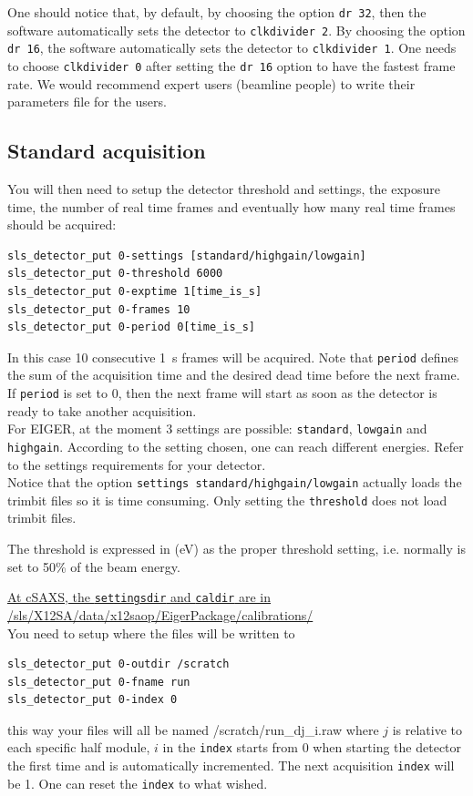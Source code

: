 \documentclass{article}
\newcommand{\E}{EIGER\xspace}
\begin{document}
One should notice that, by default, by choosing the option {\tt{dr 32}}, then the software automatically sets the detector to  {\tt{clkdivider 2}}. By choosing the option {\tt{dr 16}}, the software automatically sets the detector to  {\tt{clkdivider 1}}. One needs to choose {\tt{clkdivider 0}} after setting the {\tt{dr 16}} option to have the fastest frame rate. 
We would recommend expert users (beamline people) to write their parameters file for the users. 

\subsection{Standard acquisition}

You will then need to setup the detector threshold and settings, the exposure time, the number of real time frames and eventually how many real time frames should be acquired:
\begin{verbatim}
sls_detector_put 0-settings [standard/highgain/lowgain]
sls_detector_put 0-threshold 6000
sls_detector_put 0-exptime 1[time_is_s]
sls_detector_put 0-frames 10
sls_detector_put 0-period 0[time_is_s]
\end{verbatim}
In this case 10 consecutive 1~s frames will be acquired. Note that {\tt{period}} defines the sum of the acquisition time and the desired dead time before the next frame. If {\tt{period}} is set to 0, then the next frame will start as soon as the detector is ready to take another acquisition. \\

For \E, at the moment 3 settings are possible: {\tt{standard}}, {\tt{lowgain}} and {\tt{highgain}}. According to the setting chosen, one can reach different energies. Refer to the settings requirements for your detector.\\ 
Notice that the option  {\tt{settings standard/highgain/lowgain}} actually loads the trimbit files so it is time consuming. Only setting the {\tt{threshold}} does not load trimbit files.  

The threshold is expressed in (eV) as the proper threshold setting, i.e. normally is set to 50\% of the beam energy.  

\underline{At cSAXS, the {\tt{settingsdir}} and {\tt{caldir}} are in}\\\underline{/sls/X12SA/data/x12saop/EigerPackage/calibrations/}\\ 

You need to setup where the files will be written to
\begin{verbatim}
sls_detector_put 0-outdir /scratch
sls_detector_put 0-fname run
sls_detector_put 0-index 0
\end{verbatim}
this way your files will all be named /scratch/run\_dj\_i.raw where $j$ is relative to each specific half module, $i$ in the {\tt{index}} starts from 0 when starting the detector the first time and is automatically incremented. The next acquisition {\tt{index}} will be 1. One can reset the  {\tt{index}} to what wished.
\end{document}
